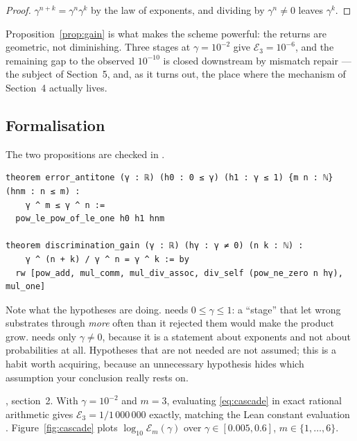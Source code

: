 \begin{proof}
$\gamma^{n+k} = \gamma^{n}\gamma^{k}$ by the law of exponents, and dividing by
$\gamma^{n} \ne 0$ leaves $\gamma^{k}$.
\end{proof}

Proposition~\ref{prop:gain} is what makes the scheme powerful: the returns are
geometric, not diminishing. Three stages at $\gamma = 10^{-2}$ give
$\mathcal{E}_3 = 10^{-6}$, and the remaining gap to the observed $10^{-10}$ is
closed downstream by mismatch repair --- the subject of Section~5, and, as it
turns out, the place where the mechanism of Section~4 actually lives.

\subsection{Formalisation}

The two propositions are checked in .

\begin{lstlisting}
theorem error_antitone (γ : ℝ) (h0 : 0 ≤ γ) (h1 : γ ≤ 1) {m n : ℕ} (hnm : n ≤ m) :
    γ ^ m ≤ γ ^ n :=
  pow_le_pow_of_le_one h0 h1 hnm

theorem discrimination_gain (γ : ℝ) (hγ : γ ≠ 0) (n k : ℕ) :
    γ ^ (n + k) / γ ^ n = γ ^ k := by
  rw [pow_add, mul_comm, mul_div_assoc, div_self (pow_ne_zero n hγ), mul_one]
\end{lstlisting}

\noindent
Note what the hypotheses are doing.  needs
$0 \le \gamma \le 1$: a ``stage'' that let wrong substrates through \emph{more}
often than it rejected them would make the product grow. 
needs only $\gamma \ne 0$, because it is a statement about exponents and not
about probabilities at all. Hypotheses that are not needed are not assumed; this
is a habit worth acquiring, because an unnecessary hypothesis hides which
assumption your conclusion really rests on.

\begin{numerics}[2.1]
, section~2. With $\gamma = 10^{-2}$ and
$m = 3$, evaluating \eqref{eq:cascade} in exact rational arithmetic gives
$\mathcal{E}_3 = 1/1\,000\,000$ exactly, matching the Lean constant evaluation
. Figure~\ref{fig:cascade} plots
$\log_{10}\mathcal{E}_m(\gamma)$ over $\gamma \in [0.005, 0.6]$, $m \in \{1,\dots,6\}$.
\end{numerics}


